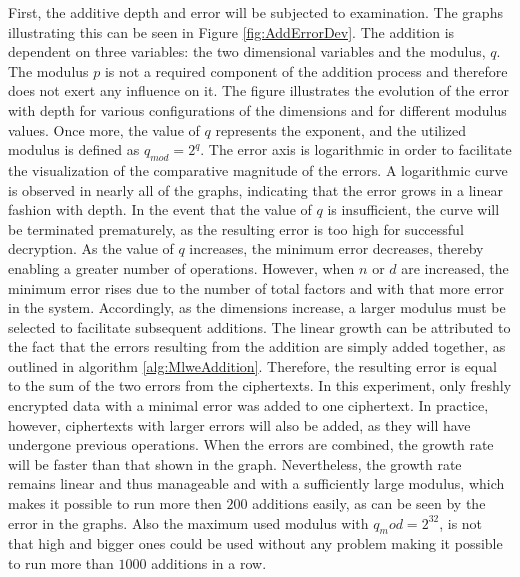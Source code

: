 First, the additive depth and error will be subjected to examination. The graphs illustrating this can be seen in Figure \ref{fig:AddErrorDev}. The addition is dependent on three variables: the two dimensional variables and the modulus, $q$. The modulus $p$ is not a required component of the addition process and therefore does not exert any influence on it. The figure illustrates the evolution of the error with depth for various configurations of the dimensions and for different modulus values. Once more, the value of $q$ represents the exponent, and the utilized modulus is defined as $q_{mod} = 2^q$. The error axis is logarithmic in order to facilitate the visualization of the comparative magnitude of the errors. A logarithmic curve is observed in nearly all of the graphs, indicating that the error grows in a linear fashion with depth. In the event that the value of $q$ is insufficient, the curve will be terminated prematurely, as the resulting error is too high for successful decryption. As the value of $q$ increases, the minimum error decreases, thereby enabling a greater number of operations. However, when $n$ or $d$ are increased, the minimum error rises due to the number of total factors and with that more error in the system. Accordingly, as the dimensions increase, a larger modulus must be selected to facilitate subsequent additions. The linear growth can be attributed to the fact that the errors resulting from the addition are simply added together, as outlined in algorithm \ref{alg:MlweAddition}. Therefore, the resulting error is equal to the sum of the two errors from the ciphertexts. In this experiment, only freshly encrypted data with a minimal error was added to one ciphertext. In practice, however, ciphertexts with larger errors will also be added, as they will have undergone previous operations. When the errors are combined, the growth rate will be faster than that shown in the graph. Nevertheless, the growth rate remains linear and thus manageable and with a sufficiently large modulus, which makes it possible to run more then $200$ additions easily, as can be seen by the error in the graphs. Also the maximum used modulus with $q_mod = 2^{32}$, is not that high and bigger ones could be used without any problem making it possible to run more than $1000$ additions in a row.

